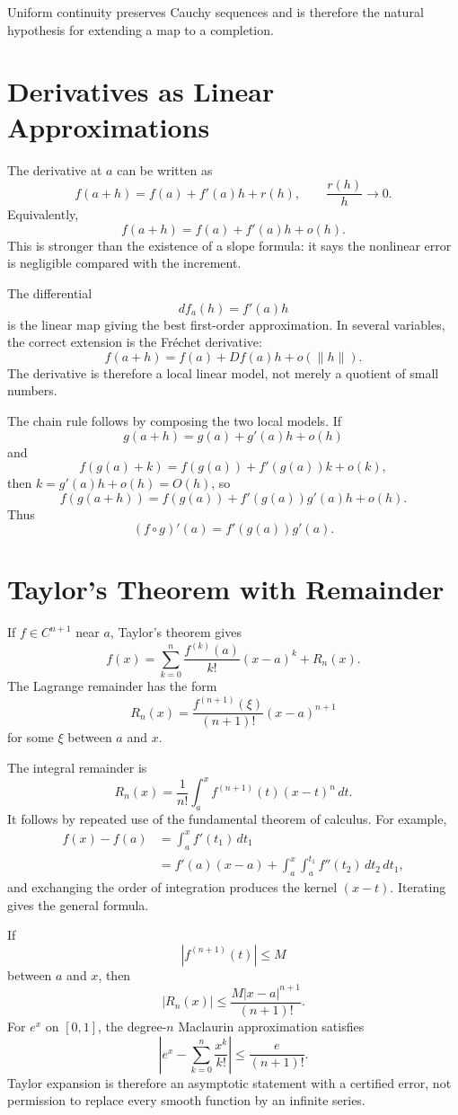 Uniform continuity preserves Cauchy sequences and is therefore the natural hypothesis for extending a map to a completion.

\section{Derivatives as Linear Approximations}

The derivative at \(a\) can be written as
\[
  f(a+h)=f(a)+f'(a)h+r(h),
  \qquad
  \frac{r(h)}{h}\to0.
\]
Equivalently,
\[
  f(a+h)=f(a)+f'(a)h+o(h).
\]
This is stronger than the existence of a slope formula: it says the nonlinear error is negligible compared with the increment.

The differential
\[
  df_a(h)=f'(a)h
\]
is the linear map giving the best first-order approximation.  In several variables, the correct extension is the Fréchet derivative:
\[
  f(a+h)=f(a)+Df(a)h+o(\|h\|).
\]
The derivative is therefore a local linear model, not merely a quotient of small numbers.

The chain rule follows by composing the two local models.  If
\[
  g(a+h)=g(a)+g'(a)h+o(h)
\]
and
\[
  f(g(a)+k)=f(g(a))+f'(g(a))k+o(k),
\]
then \(k=g'(a)h+o(h)=O(h)\), so
\[
  f(g(a+h))
  =f(g(a))+f'(g(a))g'(a)h+o(h).
\]
Thus
\[
  (f\circ g)'(a)=f'(g(a))g'(a).
\]

\section{Taylor's Theorem with Remainder}

If \(f\in C^{n+1}\) near \(a\), Taylor's theorem gives
\[
  f(x)
  =\sum_{k=0}^n
  \frac{f^{(k)}(a)}{k!}(x-a)^k
  +R_n(x).
\]
The Lagrange remainder has the form
\[
  R_n(x)
  =\frac{f^{(n+1)}(\xi)}{(n+1)!}(x-a)^{n+1}
\]
for some \(\xi\) between \(a\) and \(x\).

The integral remainder is
\[
  \boxed{
  R_n(x)
  =\frac1{n!}
  \int_a^x f^{(n+1)}(t)(x-t)^n\,dt.}
\]
It follows by repeated use of the fundamental theorem of calculus.  For example,
\[
\begin{aligned}
  f(x)-f(a)
  &=\int_a^x f'(t_1)\,dt_1\\
  &=f'(a)(x-a)
  +\int_a^x\int_a^{t_1}f''(t_2)\,dt_2\,dt_1,
\end{aligned}
\]
and exchanging the order of integration produces the kernel \((x-t)\).  Iterating gives the general formula.

If
\[
  |f^{(n+1)}(t)|\le M
\]
between \(a\) and \(x\), then
\[
  |R_n(x)|
  \le\frac{M|x-a|^{n+1}}{(n+1)!}.
\]
For \(e^x\) on \([0,1]\), the degree-\(n\) Maclaurin approximation satisfies
\[
  \left|
  e^x-\sum_{k=0}^n\frac{x^k}{k!}
  \right|
  \le\frac{e}{(n+1)!}.
\]
Taylor expansion is therefore an asymptotic statement with a certified error, not permission to replace every smooth function by an infinite series.


